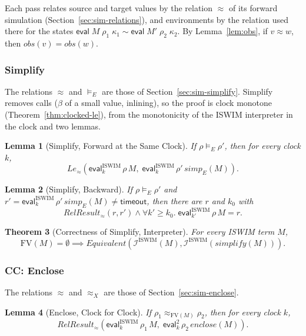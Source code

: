 \documentclass[10pt]{article}
\theoremstyle{acmplain}
\newtheorem{theorem}{Theorem}[section]
\newtheorem{lemma}[theorem]{Lemma}
\newcommand{\key}[1]{\mathsf{#1}}
\newcommand{\pass}[1]{\mathit{#1}}
\newcommand{\FV}{\mathrm{FV}}
\newcommand{\ev}[3]{\key{eval}\;#1\;#2\;#3}
\newcommand{\obs}{\mathit{obs}}
\newcommand{\Equiv}{\mathit{Equivalent}}
\newcommand{\tmo}{\key{timeout}}
\newcommand{\RelRes}[1]{\mathit{RelResult}_{#1}}
\newcommand{\EV}[2]{\key{eval}^{#1}_{#2}}
\newcommand{\Interp}[1]{\mathcal{I}^{#1}}
\begin{document}
Each pass relates source and target values by the relation $\approx$ of its
forward simulation (Section~\ref{sec:sim-relations}), and environments by the
relation used there for the states $\ev{M}{\rho_1}{\kappa_1} \sim \ev{M'}{\rho_2}{\kappa_2}$.
By Lemma~\ref{lem:obs}, if $v \approx w$, then $\obs(v) = \obs(w)$.

\subsubsection{Simplify}

The relations $\approx$ and $\models_E$ are those of
Section~\ref{sec:sim-simplify}. Simplify removes calls ($\beta$ of a small
value, inlining), so the proof is clock monotone (Theorem~\ref{thm:clocked-le}), from
the monotonicity of the ISWIM interpreter in the clock and two lemmas.

\begin{lemma}[Simplify, Forward at the Same Clock]
If $\rho \models_E \rho'$, then for every clock $k$,
\[
  \mathit{Le}_{\approx}(\EV{\mathrm{ISWIM}}{k}\,\rho\,M,\; \EV{\mathrm{ISWIM}}{k}\,\rho'\,\pass{simp}_E(M)) .
\]
\end{lemma}

\begin{lemma}[Simplify, Backward]
If $\rho \models_E \rho'$ and $r' = \EV{\mathrm{ISWIM}}{k}\,\rho'\,\pass{simp}_E(M) \neq \tmo$, then there are
$r$ and $k_0$ with
\[
  \RelRes{\approx}(r, r') \land \forall k' \geq k_0.\; \EV{\mathrm{ISWIM}}{k'}\,\rho\,M = r .
\]
\end{lemma}

\begin{theorem}[Correctness of Simplify, Interpreter]\label{thm:simplify-clk}
For every ISWIM term $M$,
\[
  \FV(M) = \emptyset \implies
  \Equiv(\Interp{\mathrm{ISWIM}}(M), \Interp{\mathrm{ISWIM}}(\pass{simplify}(M))) .
\]
\end{theorem}

\subsubsection{CC: Enclose}

The relations $\approx$ and $\approx_X$ are those of Section~\ref{sec:sim-enclose}.

\begin{lemma}[Enclose, Clock for Clock]\label{lem:enclose-clk}
If $\rho_1 \approx_{\FV(M)} \rho_2$, then for every clock $k$,
\[
  \RelRes{\approx}(\EV{\mathrm{ISWIM}}{k}\,\rho_1\,M,\; \EV{2}{k}\,\rho_2\,\pass{enclose}(M)) .
\]
\end{lemma}
\end{document}
